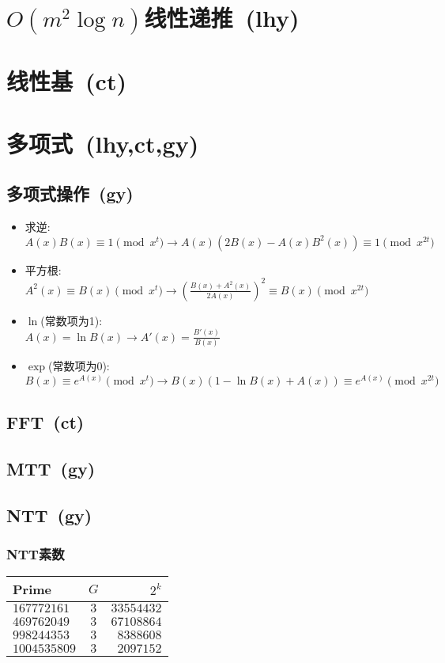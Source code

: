 \section{$ O(m ^ 2 \log n) $线性递推\ \small(lhy)}
\section{线性基\ \small(ct)}
\section{多项式\ \small(lhy,ct,gy)}
    \subsection*{多项式操作\ \small(gy)}
        \begin{itemize}[wide=0pt]
            \item 求逆:
            \\$ A(x) B(x) \equiv 1 \pmod{x^t} \to A(x) (2B(x) - A(x) B^2(x)) \equiv 1 \pmod{x^{2t}} $
            \item 平方根:
            \\$ A^2(x) \equiv B(x) \pmod{x^t} \to (\frac{B(x) + A^2(x)}{2A(x)})^2 \equiv B(x) \pmod{x^{2t}} $
            \item $ \ln $(常数项为1):
            \\$ A(x) = \ln B(x) \to A'(x) = \frac{B'(x)}{B(x)} $
            \item $ \exp $(常数项为0):
            \\$ B(x) \equiv e^{A(x)} \pmod{x^t} \to B(x) (1 - \ln B(x) + A(x)) \equiv e^{A(x)} \pmod{x^{2t}} $
        \end{itemize}
    \subsection*{FFT\ \small(ct)}
    \subsection*{MTT\ \small(gy)}
    \subsection*{NTT\ \small(gy)}
        \subsubsection*{NTT素数}
            \begin{tabular}{l c r}
                \hline
                Prime & $ G $ & $ 2^k $\\\hline
                $ 167772161 $ & $ 3 $ & $ 33554432 $\\\hline
                $ 469762049 $ & $ 3 $ & $ 67108864 $\\\hline
                $ 998244353 $ & $ 3 $ & $ 8388608 $\\\hline
                $ 1004535809 $ & $ 3 $ & $ 2097152 $\\\hline
            \end{tabular}
